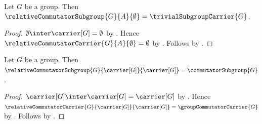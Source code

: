 \begin{corollary}\label{relative_commutator_subgroup_empty_right}
    Let $G$ be a group.
    Then
        $\relativeCommutatorSubgroup{G}{A}{\emptyset}=
            \trivialSubgroupCarrier{G}$.
\end{corollary}
\begin{proof}
    $\emptyset\inter\carrier[G]=\emptyset$ by
        .
    Hence $\relativeCommutatorCarrier{G}{A}{\emptyset}=\emptyset$ by
        .
    Follows by
        .
\end{proof}

\begin{theorem}\label{relative_commutator_subgroup_full_carrier}
    Let $G$ be a group.
    Then
        $\relativeCommutatorSubgroup{G}{\carrier[G]}{\carrier[G]}=
            \commutatorSubgroup{G}$.
\end{theorem}
\begin{proof}
    $\carrier[G]\inter\carrier[G]=\carrier[G]$ by
        .
    Hence
        $\relativeCommutatorCarrier{G}{\carrier[G]}{\carrier[G]}=
            \groupCommutatorCarrier{G}$ by
        .
    Follows by
        .
\end{proof}

